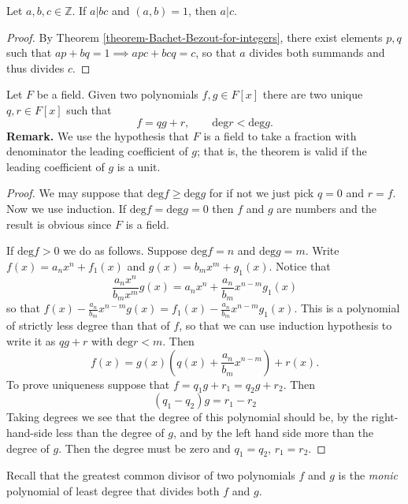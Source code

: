 \begin{lemma}
\label{lemma-relat-prime-divid-impli-divid}
Let $a,b,c \in \mathbb{Z}$. If $a|bc$ and
$(a,b)=1$, then $a|c$.
\end{lemma}

\begin{proof}
By Theorem
\ref{theorem-Bachet-Bezout-for-integers},
there exist elements $p,q$ such
that $ap+bq=1\implies apc+bcq=c$, so that $a$
divides both summands and thus
divides $c$.
\end{proof}

\begin{theorem}
\label{theorem-divis-algor-polyn}
\begin{reference}
\cite[Theorem 1.48]{MMST}
\end{reference}
Let $F$ be a field. Given two polynomials
$f,g \in F[x]$ there are two unique
$q,r \in F[x]$ such that
$$
f=qg+r,\qquad \text{deg}r<\text{deg}g.
$$
{\bf Remark.} We use the hypothesis that $F$
is a field to take a fraction with
denominator the leading coefficient of $g$;
that is, the theorem is valid if the
leading coefficient of $g$ is a unit.
\end{theorem}

\begin{proof}
We may suppose that $\text{deg}f \geq
\text{deg}g$ for if not we just pick
$q=0$ and $r=f$. Now we use induction.
If $\text{deg}f=\text{deg}g=0$ then $f$ and
$g$ are numbers and the result is
obvious since $F$ is a field.

If $\text{deg}f>0$ we do as follows. Suppose
$\text{deg}f=n$ and
$\text{deg}g=m$. Write $f(x)=a_nx^n+f_1(x)$
and $g(x)=b_mx^m+g_1(x)$. Notice
that
$$
\frac{a_nx^n}{b_mx^m}g(x)=a_nx^n+\frac{a_n}
{b_m}x^{n-m}g_1(x)
$$
so that
$f(x)-\frac{a_n}{b_m}x^{n-m}g(x)=f_1(x)-
\frac{a_n}{b_m}x^{n-m}g_1(x)$.
This is a polynomial of strictly less degree
than that of $f$, so that we can
use induction hypothesis to write it as
$qg+r$ with $\text{deg}r<m$. Then
$$
f(x)=g(x)\left(q(x)+\frac{a_n}{b_m}x^{n-m}
\right)+r(x).
$$
To prove uniqueness suppose that
$f=q_1g+r_1=q_2g+r_2$.
Then
$$
(q_1-q_2)g=r_1-r_2
$$
Taking degrees we see that the degree of this
polynomial should be,
by the right-hand-side less than the degree
of $g$,
and by the left hand side more than the
degree of $g$.
Then the degree must be zero and $q_1=q_2$,
$r_1=r_2$.
\end{proof}

Recall that the greatest common divisor of
two polynomials $f$ and $g$
is the {\it monic}
polynomial of least degree that divides both
$f$ and $g$.


